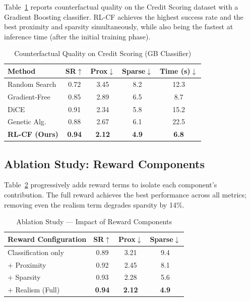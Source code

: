 \documentclass[conference]{IEEEtran}
\begin{document}
Table~\ref{tab:cf_comparison} reports counterfactual quality on the Credit
Scoring dataset with a Gradient Boosting classifier. RL-CF achieves the highest
success rate and the best proximity and sparsity simultaneously, while also
being the fastest at inference time (after the initial training phase).

\begin{table}[t]
\centering
\caption{Counterfactual Quality on Credit Scoring (GB Classifier)}
\label{tab:cf_comparison}
\begin{tabular}{lcccc}
\toprule
\textbf{Method} & \textbf{SR}$\uparrow$ & \textbf{Prox}$\downarrow$
  & \textbf{Sparse}$\downarrow$ & \textbf{Time (s)}$\downarrow$ \\
\midrule
Random Search   & 0.72 & 3.45 & 8.2 & 12.3 \\
Gradient-Free   & 0.85 & 2.89 & 6.5 &  8.7 \\
DiCE            & 0.91 & 2.34 & 5.8 & 15.2 \\
Genetic Alg.    & 0.88 & 2.67 & 6.1 & 22.5 \\
\textbf{RL-CF (Ours)} & \textbf{0.94} & \textbf{2.12}
  & \textbf{4.9} & \textbf{6.8} \\
\bottomrule
\end{tabular}
\end{table}

\subsection{Ablation Study: Reward Components}

Table~\ref{tab:ablation} progressively adds reward terms to isolate each
component's contribution. The full reward achieves the best performance across
all metrics; removing even the realism term degrades sparsity by 14\%.

\begin{table}[t]
\centering
\caption{Ablation Study --- Impact of Reward Components}
\label{tab:ablation}
\begin{tabular}{lccc}
\toprule
\textbf{Reward Configuration} & \textbf{SR}$\uparrow$
  & \textbf{Prox}$\downarrow$ & \textbf{Sparse}$\downarrow$ \\
\midrule
Classification only           & 0.89 & 3.21 & 9.4 \\
$+$ Proximity                 & 0.92 & 2.45 & 8.1 \\
$+$ Sparsity                  & 0.93 & 2.28 & 5.6 \\
$+$ Realism (Full)            & \textbf{0.94} & \textbf{2.12} & \textbf{4.9} \\
\bottomrule
\end{tabular}
\end{table}
\end{document}
